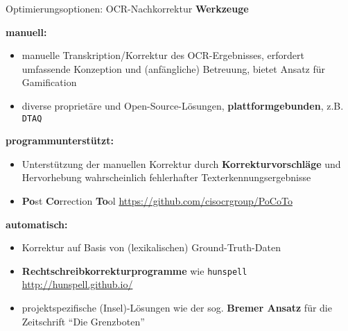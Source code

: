 \documentclass{bbawslides}
\begin{document}
\begin{bbawslide}{Optimierungsoptionen: OCR-Nachkorrektur}
  \vspace*{2mm}%
  \centerslidestrue%
  \textbf{Werkzeuge}
  \begin{mitemize}
    \item \textbf{manuell:}
    \begin{itemize}\small
      \item manuelle Transkription/Korrektur des OCR-Ergebnisses, erfordert umfassende Konzeption und (anfängliche) Betreuung, bietet Ansatz für Gamification
      \item diverse proprietäre und Open-Source-Lösungen, \textbf{plattformgebunden}, z.B. \texttt{DTAQ}
    \end{itemize}
    \item \textbf{programmunterstützt:}
    \begin{itemize}\small
      \item Unterstützung der manuellen Korrektur durch \textbf{Korrekturvorschläge} und Hervorhebung wahrscheinlich fehlerhafter Texterkennungsergebnisse
      \item \textbf{Po}st \textbf{Co}rrection \textbf{To}ol \url{https://github.com/cisocrgroup/PoCoTo}
    \end{itemize}
    \item \textbf{automatisch:}
    \begin{itemize}\small
      \item Korrektur auf Basis von (lexikalischen) Ground-Truth-Daten
      \item \textbf{Rechtschreibkorrekturprogramme} wie \texttt{hunspell} \url{http://hunspell.github.io/}
      \item projektspezifische (Insel)-Lösungen wie der sog. \textbf{Bremer Ansatz} für die Zeitschrift \enquote{Die Grenzboten} 
    \end{itemize}
  \end{mitemize}
\end{bbawslide}
\end{document}
